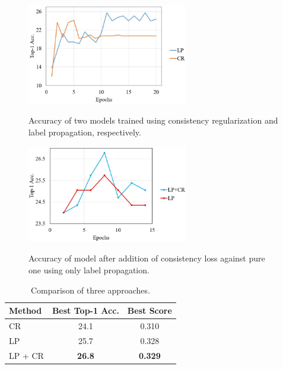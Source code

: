 \documentclass[10pt,twocolumn,letterpaper]{article}
\begin{document}
	
	\begin{figure}
		\centering
		\includegraphics[width=7cm]{CRvsLP.JPG}
		\label{fig:CRvsLPcomparison}
		\caption{Accuracy of two models trained using consistency regularization and label propagation, respectively.}
	\end{figure}
	
	\begin{figure}
		\centering
		\includegraphics[width=7cm]{LPvsLP+CR.JPG}
		\label{fig:LPvsLP+CRcomparison}
		\caption{Accuracy of model after addition of consistency loss against pure one using only label propagation.}
	\end{figure}
	
	
	\begin{table}
		\centering
		\label{table:CRvsLPvsLPCR}
		\begin{tabular}{ p{1.5cm}|c c  }
			Method & Best Top-1 Acc. & Best Score\\
			\hline
			CR & 24.1 & 0.310  \\
			LP & 25.7 & 0.328 \\
			LP + CR & \textbf{26.8} & \textbf{0.329} \\
			\hline
		\end{tabular} \\ [1ex]
		\caption{Comparison of three approaches.}
	\end{table}
	
\end{document}
